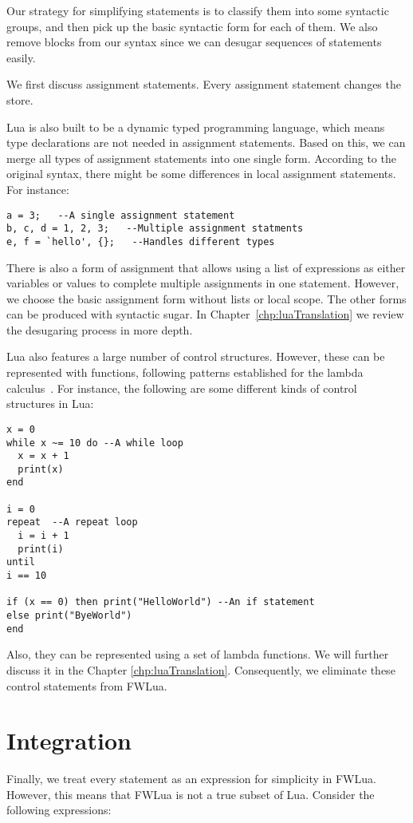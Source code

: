 Our strategy for simplifying statements is to classify them into some syntactic groups, and then pick up the basic syntactic form for each of them.
We also remove blocks from our syntax since we can desugar sequences of statements easily.

We first discuss assignment statements.
Every assignment statement changes the store. 

Lua is also built to be a dynamic typed programming language, 
which means type declarations are not needed in assignment statements.
Based on this, we can merge all types of assignment statements into one single form. According to the original syntax, there might be some differences in local assignment statements.
For instance:

\begin{verbatim}
a = 3;   --A single assignment statement
b, c, d = 1, 2, 3;   --Multiple assignment statments
e, f = `hello', {};   --Handles different types
\end{verbatim}

There is also a form of assignment that allows using a list of expressions as either variables or values to complete multiple assignments in one statement. However, we choose the basic assignment form without lists or local scope.  The other forms can be produced with syntactic sugar.
In Chapter~\ref{chp:luaTranslation} we review the desugaring process in more depth.

Lua also features a large number of control structures.
However, these can be represented with functions,
following patterns established for the lambda calculus~\cite{TAPL}.
For instance, the following are some different kinds of control structures in Lua:
\begin{verbatim}
x = 0
while x ~= 10 do --A while loop
  x = x + 1
  print(x)
end

i = 0
repeat  --A repeat loop
  i = i + 1
  print(i)
until
i == 10

if (x == 0) then print("HelloWorld") --An if statement
else print("ByeWorld")
end
\end{verbatim}

Also, they can be represented using a set of lambda functions.
We will further discuss it in the Chapter \ref{chp:luaTranslation}.
Consequently, we eliminate these control statements from FWLua.

\section{Integration}
Finally, we treat every statement as an expression for simplicity in FWLua.
However, this means that FWLua is not a true subset of Lua.
Consider the following expressions:

